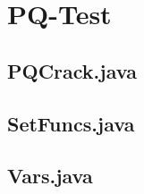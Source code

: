\section{PQ-Test}


\subsection{PQCrack.java}
	
\clearpage



\subsection{SetFuncs.java}
	
\clearpage


\subsection{Vars.java}
	
\clearpage
